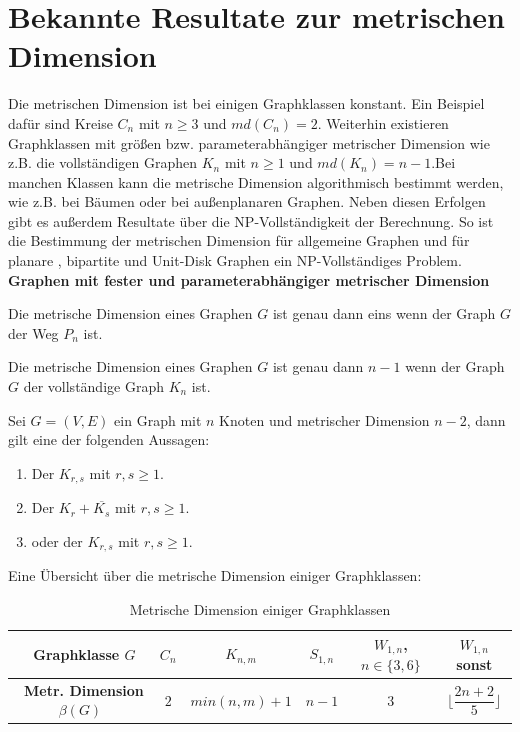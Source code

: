 \section{Bekannte Resultate zur metrischen Dimension}
Die metrischen Dimension ist bei einigen Graphklassen konstant. Ein Beispiel dafür sind Kreise $C_n$ mit $n\geq 3$ und $md(C_n)=2$. Weiterhin existieren Graphklassen mit größen bzw. parameterabhängiger metrischer Dimension wie z.B. die vollständigen Graphen $K_n$ mit $n \geq 1$ und $md(K_n)=n-1$.\newline Bei manchen Klassen kann die metrische Dimension algorithmisch bestimmt werden, wie z.B. bei Bäumen oder bei außenplanaren Graphen.\cite{}\newline
Neben diesen Erfolgen gibt es außerdem Resultate über die NP-Vollständigkeit der Berechnung. So ist die Bestimmung der metrischen Dimension für allgemeine Graphen \cite{} und für planare \cite{}, bipartite \cite{} und Unit-Disk Graphen \cite{} ein NP-Vollständiges Problem.\newline\newline
{\textbf{Graphen mit fester und parameterabhängiger metrischer Dimension}}
\begin{lem}
\label{path}\cite{landmarks}
Die metrische Dimension eines Graphen $G$ ist genau dann eins wenn der Graph $G$ der Weg $P_n$ ist.
\end{lem}
\begin{lem}
\label{complete}\cite{landmarks}
Die metrische Dimension eines Graphen $G$ ist genau dann $n-1$ wenn der Graph $G$ der vollständige Graph $K_n$ ist.
\end{lem}
\begin{lem}\cite{landmarks}
Sei $G = (V, E)$ ein Graph mit $n$ Knoten und metrischer Dimension $n-2$, dann gilt eine der folgenden Aussagen:
\begin{enumerate}
\item Der $K_{r,s}$ mit $r,s \geq 1$.
\item Der $K_{r}+ \overline{K_s}$ mit $r,s \geq 1$.
\item oder der $K_{r,s}$ mit $r,s \geq 1$.
\end{enumerate}
\end{lem}
Eine Übersicht über die metrische Dimension einiger Graphklassen:
  \begin{table}[htb]
     \centering
     \begin{tabularx}{\textwidth}{|c|c|c|c|c|c|}
     	\hline  
       \parbox[c][5em][c]{0pt}{~}\textbf{Graphklasse} $G$ & $C_n$&$K_{n,m}$&$S_{1,n}$&$W_{1,n}$, $n \in \{3,6\}$&$W_{1,n}$ sonst \\[2em]
		\hline       
       \parbox[c][5em][c]{0pt}{~}\textbf{Metr. Dimension $\beta(G)$}& $2$&$min(n,m)+1$& $n-1$  &$3$  &$\lfloor \dfrac{2n+2}{5} \rfloor$        \\[2em]
       	\hline  
     \end{tabularx}
 
     \caption{Metrische Dimension einiger Graphklassen}
     \label{tbl:Metrische Dimension einiger Graphklassen}
   \end{table}
